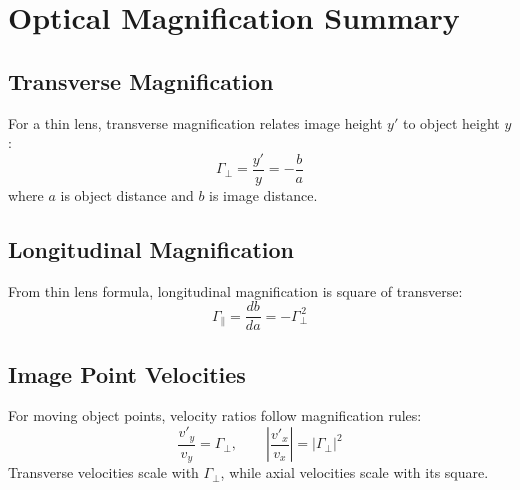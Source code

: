 \documentclass{article}
\begin{document}
\section*{Optical Magnification Summary}

\subsection*{Transverse Magnification}
For a thin lens, transverse magnification relates image height $y'$ to object height $y$:
\[
\Gamma_{\perp}=\frac{y'}{y}=-\frac{b}{a}
\]
where $a$ is object distance and $b$ is image distance.

\subsection*{Longitudinal Magnification}
From thin lens formula, longitudinal magnification is square of transverse:
\[
\Gamma_{\parallel}=\frac{db}{da}=-\Gamma_{\perp}^{\,2}
\]

\subsection*{Image Point Velocities}
For moving object points, velocity ratios follow magnification rules:
\[
\frac{v'_y}{v_y}=\Gamma_{\perp}, \qquad \left|\frac{v'_x}{v_x}\right|=|\Gamma_{\perp}|^2
\]
Transverse velocities scale with $\Gamma_{\perp}$, while axial velocities scale with its square.
\end{document}
